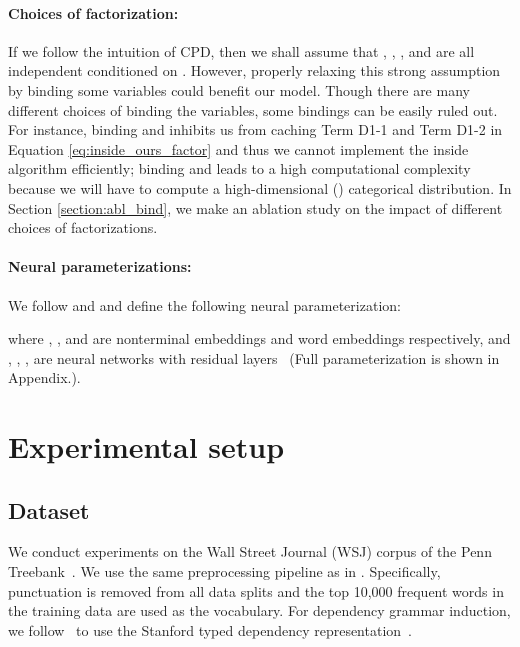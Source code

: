 \documentclass[11pt,a4paper]{article}
\begin{document}
\paragraph{Choices of factorization:}
If we follow the intuition of CPD, then we shall assume that , , , and  are all independent conditioned on . However, properly relaxing this strong assumption by binding some variables could benefit our model.
Though there are many different choices of binding the variables,
some bindings can be easily ruled out.
For instance, binding  and  inhibits us from caching Term D1-1 and Term D1-2 in Equation \ref{eq:inside_ours_factor} and thus we cannot implement the inside algorithm efficiently;
binding  and  leads to a high computational complexity because we will have to compute a high-dimensional () categorical distribution. In Section \ref{section:abl_bind}, we make an ablation study on the impact of different choices of factorizations.

\paragraph{Neural parameterizations:}
We follow \citet{kim-etal-2019-compound} and \citet{zhu-etal-2020-return} and define the following neural parameterization:

where , ,
 and  are nonterminal embeddings and word embeddings respectively,
and , , ,  are neural networks with residual layers~\citep{he2016residual} (Full parameterization is shown in Appendix.).










\section{Experimental setup}
\subsection{Dataset}
We conduct experiments  on the Wall Street Journal (WSJ) corpus of the Penn Treebank~\citep{marcus-etal-1994-penn}.
We use the same preprocessing pipeline as in \citet{kim-etal-2019-compound}.
Specifically, punctuation is removed from all data splits
and the top 10,000 frequent words in the training data are used as the vocabulary. 
For dependency grammar induction,
we follow~\cite{zhu-etal-2020-return} to use the Stanford typed dependency representation~\citep{de-marneffe-manning-2008-stanford}.
\end{document}
